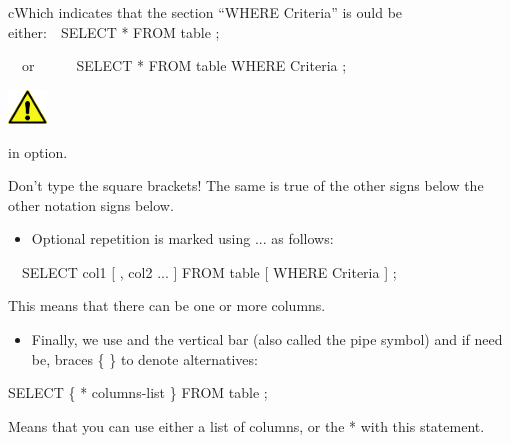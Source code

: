 cWhich indicates that the section {}``WHERE Criteria{}'' is ould be either:\ \ SELECT * FROM table ;

\ \ or\ \ \ \ \ \ SELECT * FROM table WHERE Criteria ;



\begin{center}
  
\includegraphics[width=1.048cm,height=0.903cm]{images/img (2).png}

\end{center}
in option.

Don't type the square brackets! The same is true of the other signs below the other notation signs below.

\begin{itemize}
\item Optional repetition is marked using ... as follows:
\end{itemize}
\ \   SELECT col1 [ , col2 ... ]  FROM table  [ WHERE Criteria ] ;

This means that there can be one or more columns.

\begin{itemize}
\item Finally, we use and the vertical bar {\textbar} (also called the pipe symbol) and if need be, braces \{ \} to denote alternatives:
\end{itemize}
 SELECT \{ * {\textbar} columns-list \} FROM table ;

Means that you can use either a list of columns, or the * with this statement.

\clearpage